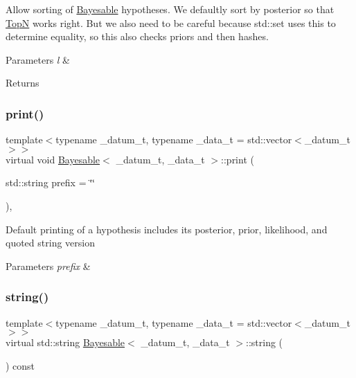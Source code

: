 Allow sorting of \hyperlink{class_bayesable}{Bayesable} hypotheses. We defaultly sort by posterior so that \hyperlink{class_top_n}{TopN} works right. But we also need to be careful because std\+::set uses this to determine equality, so this also checks priors and then hashes. 
\begin{DoxyParams}{Parameters}
{\em l} & \\
\hline
\end{DoxyParams}
\begin{DoxyReturn}{Returns}

\end{DoxyReturn}
\mbox{\label{class_bayesable_a87d5d9481d6a72b017e44b175071fa5e}} 
\subsubsection{\texorpdfstring{print()}{print()}}
{\footnotesize\ttfamily template$<$typename \+\_\+datum\+\_\+t, typename \+\_\+data\+\_\+t = std\+::vector$<$\+\_\+datum\+\_\+t$>$$>$ \\
virtual void \hyperlink{class_bayesable}{Bayesable}$<$ \+\_\+datum\+\_\+t, \+\_\+data\+\_\+t $>$\+::print (\begin{DoxyParamCaption}\item[{std\+::string}]{prefix = {\ttfamily \char`\"{}\char`\"{}} }\end{DoxyParamCaption})\hspace{0.3cm}{\ttfamily [inline]}, {\ttfamily [virtual]}}

Default printing of a hypothesis includes its posterior, prior, likelihood, and quoted string version 
\begin{DoxyParams}{Parameters}
{\em prefix} & \\
\hline
\end{DoxyParams}
\mbox{\label{class_bayesable_afcea9b439bcf321d5354710d8861cb54}} 
\subsubsection{\texorpdfstring{string()}{string()}}
{\footnotesize\ttfamily template$<$typename \+\_\+datum\+\_\+t, typename \+\_\+data\+\_\+t = std\+::vector$<$\+\_\+datum\+\_\+t$>$$>$ \\
virtual std\+::string \hyperlink{class_bayesable}{Bayesable}$<$ \+\_\+datum\+\_\+t, \+\_\+data\+\_\+t $>$\+::string (\begin{DoxyParamCaption}{ }\end{DoxyParamCaption}) const\hspace{0.3cm}{\ttfamily [pure virtual]}}



